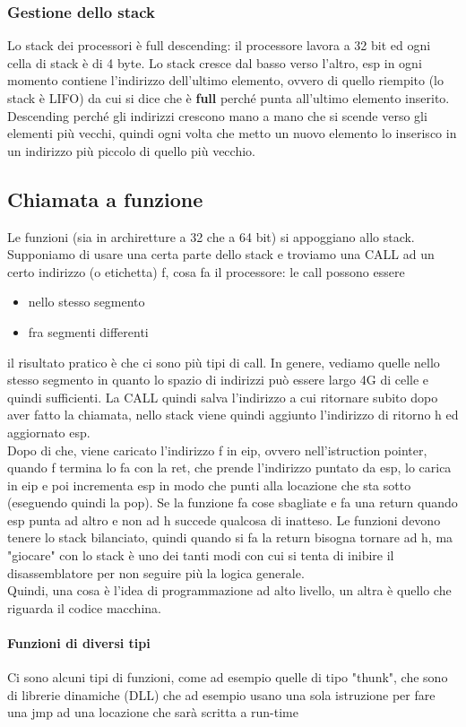 \documentclass[12pt, oneside]{extbook}
\begin{document}
\subsubsection{Gestione dello stack}
Lo stack dei processori è full descending: il processore lavora a 32 bit ed ogni cella di stack è di 4 byte. Lo stack cresce dal basso verso l'altro, esp in ogni momento contiene l'indirizzo dell'ultimo elemento, ovvero di quello riempito (lo stack è LIFO) da cui si dice che è \textbf{full} perché punta all'ultimo elemento inserito. Descending perché gli indirizzi crescono mano a mano che si scende verso gli elementi più vecchi, quindi ogni volta che metto un nuovo elemento lo inserisco in un indirizzo più piccolo di quello più vecchio.
\subsection{Chiamata a funzione}
Le funzioni (sia in archiretture a 32 che a 64 bit) si appoggiano allo stack. Supponiamo di usare una certa parte dello stack e troviamo una CALL ad un certo indirizzo (o etichetta) f, cosa fa il processore: le call possono essere
\begin{itemize}
\item nello stesso segmento
\item fra segmenti differenti
\end{itemize}
il risultato pratico è che ci sono più tipi di call. In genere, vediamo quelle nello stesso segmento in quanto lo spazio di indirizzi può essere largo 4G di celle e quindi sufficienti. La CALL quindi salva l'indirizzo a cui ritornare subito dopo aver fatto la chiamata, nello stack viene quindi aggiunto l'indirizzo di ritorno h ed aggiornato esp.\\ Dopo di che, viene caricato l'indirizzo f in eip, ovvero nell'istruction pointer, quando f termina lo fa con la \textsf{ret}, che prende l'indirizzo puntato da esp, lo carica in eip e poi incrementa esp in modo che punti alla locazione che sta sotto (eseguendo quindi la pop). Se la funzione fa cose sbagliate e fa una return quando esp punta ad altro e non ad h succede qualcosa di inatteso. Le funzioni devono tenere lo stack bilanciato, quindi quando si fa la return bisogna tornare ad h, ma "giocare" con lo stack è uno dei tanti modi con cui si tenta di inibire il disassemblatore per non seguire più la logica generale.\\ Quindi, una cosa è l'idea di programmazione ad alto livello, un altra è quello che riguarda il codice macchina.
\paragraph{Funzioni di diversi tipi}
Ci sono alcuni tipi di funzioni, come ad esempio quelle di tipo "thunk", che sono di librerie dinamiche (DLL) che ad esempio usano una sola istruzione per fare una jmp ad una locazione che sarà scritta a run-time
\end{document}
